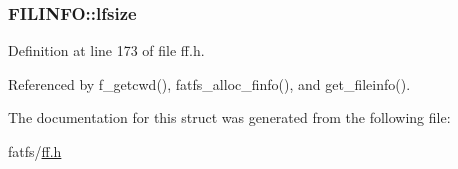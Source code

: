 \subsubsection[{\texorpdfstring{lfsize}{lfsize}}]{ F\+I\+L\+I\+N\+F\+O\+::lfsize}\hypertarget{structFILINFO_a2527c511ff4d12d285dbf3c4b3c9fb7b}{}\label{structFILINFO_a2527c511ff4d12d285dbf3c4b3c9fb7b}


Definition at line 173 of file ff.\+h.



Referenced by f\+\_\+getcwd(), fatfs\+\_\+alloc\+\_\+finfo(), and get\+\_\+fileinfo().



The documentation for this struct was generated from the following file\+:\begin{DoxyCompactItemize}
\item 
fatfs/\hyperlink{ff_8h}{ff.\+h}\end{DoxyCompactItemize}
